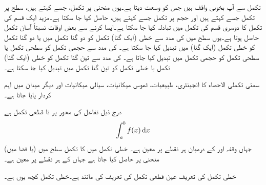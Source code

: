 تکمل سے آپ بخوبی واقف ہیں جس کو  وسعت دیتا ہے۔یوں منحنی پر تکمل، جسے  کہتے ہیں، سطح پر تکمل جسے  کہتے ہیں اور حجم پر تکمل جسے  کہتے ہیں،  حاصل کیا جا سکتا ہے۔مزید ایک قسم کی تکمل کا دوسری قسم کی تکمل میں تبادلہ کیا جا سکتا ہے۔ایسا کرنے سے بعض اوقات نسبتاً آسان تکمل حاصل ہوتا ہے۔یوں سطح میں   کی مدد سے خطی (ایک گنا) تکمل کو دو گنا تکمل میں یا دو گنا تکمل کو خطی تکمل (ایک گنا) میں تبدیل کیا جا سکتا ہے۔  کی مدد سے حجمی تکمل کو سطحی تکمل یا سطحی تکمل کو حجمی تکمل میں تبدیل کیا جاتا ہے۔ کی مدد سے تین گنا تکمل کو خطی (ایک گنا) تکمل یا خطی تکمل کو تین گنا تکمل میں تبدیل کیا جا سکتا ہے۔

سمتی تکملی الاحصاء کا انجینئری، طبیعیات، ٹھوس میکانیات، سیالی میکانیات اور دیگر میدان میں اہم کردار پایا جاتا ہے۔

 درج ذیل  تفاعل  کی  محور پر  تا  قطعی تکمل ہے
\begin{align}\label{مساوات_سمتی_تکمل_قطعی}
\int_a^b f(x)\dif x
\end{align}
جہاں وقفہ  اور  کے درمیان  ہر نقطے پر  معین ہے۔ خطی تکمل میں  کا تکمل سطح میں (یا فضا میں) منحنی  پر حاصل کیا جاتا ہے جہاں  کے ہر نقطے پر  معین ہے۔

خطی تکمل کی تعریف عین قطعی تکمل کی تعریف کی مانند ہے۔خطی تکمل کچھ یوں ہے۔

